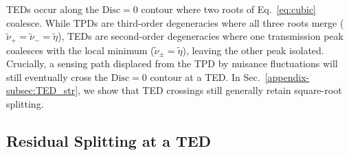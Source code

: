 \documentclass[%
  reprint,
  amsmath,amssymb,
  aps,
  prapplied,
  superscriptaddress,
  longbibliography]{revtex4-2}
\begin{document}
TEDs occur along the $\mathrm{Disc} = 0$ contour where two roots of Eq.~\ref{eq:cubic} coalesce. While TPDs are third-order degeneracies where all three roots merge ($\tilde{\nu}_+ = \tilde{\nu}_- = \tilde{\eta}$), TEDs are second-order degeneracies where one transmission peak coalesces with the local minimum ($\tilde{\nu}_\pm = \tilde{\eta}$), leaving the other peak isolated. Crucially, a sensing path displaced from the TPD by nuisance fluctuations will still eventually cross the $\mathrm{Disc} = 0$ contour at a TED. In Sec.~\ref{appendix-subsec:TED_str}, we show that TED crossings still generally retain square-root splitting. 

\subsection{\label{appendix-sec:vieta}Residual Splitting at a TED}
\end{document}
